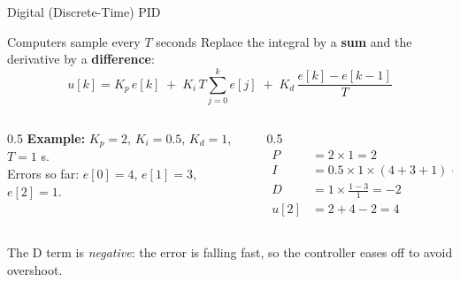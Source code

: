 \documentclass[aspectratio=169]{beamer}
\begin{document}
	\begin{frame}{Digital (Discrete-Time) PID}
		\begin{block}{Computers sample every $T$ seconds}
			Replace the integral by a \textbf{sum} and the derivative by a \textbf{difference}:
			\[
			u[k] = K_p\,e[k] \;+\; K_i\,T\sum_{j=0}^{k} e[j] \;+\; K_d\,\frac{e[k]-e[k-1]}{T}
			\]
		\end{block}
		\begin{columns}[T]
			\begin{column}{0.5\textwidth}
				\textbf{Example:} $K_p = 2$, $K_i = 0.5$, $K_d = 1$, $T = 1$ s.\\
				Errors so far: $e[0] = 4$, $e[1] = 3$, $e[2] = 1$.
			\end{column}
			\begin{column}{0.5\textwidth}
				\small
				\begin{align*}
					P &= 2\times1 = 2\\
					I &= 0.5\times1\times(4+3+1) = 4\\
					D &= 1\times\tfrac{1-3}{1} = -2\\
					u[2] &= 2 + 4 - 2 = \boxed{4}
				\end{align*}
			\end{column}
		\end{columns}
		\vspace{0.1cm}
		\footnotesize\centering The D term is \emph{negative}: the error is falling fast, so the controller eases off to avoid overshoot.
	\end{frame}
	
\end{document}
